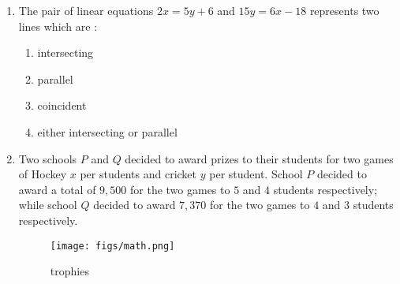 \begin{enumerate}
	\item The pair of linear equations $ 2x=5y+6 $ and $ 15y=6x-18 $ represents two lines which are : 
\begin{enumerate}
    \item intersecting
    \item parallel
    \item coincident
    \item either intersecting or parallel
\end{enumerate}
\item Two schools $P$ and $Q$ decided to award prizes to their students for two games of Hockey \rupee $x$ per students and cricket \rupee $y$ per student. School $P$
decided to award a total of \rupee $9,500$ for the two games to $5$ and $4$ students respectively; while school $Q$ decided to award \rupee $7,370$ for the two games to $4$ and $3$ students respectively.
\begin{figure}[H]
    \centering
    \texttt{[image: figs/math.png]}
    \caption{trophies}
    \label{fig:trophies}
\end{figure}



\end{enumerate}
